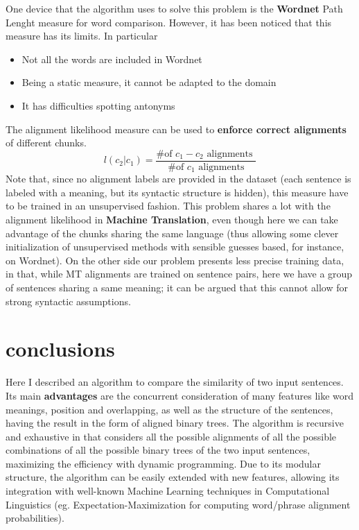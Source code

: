 One device that the algorithm uses to solve this problem is the \textbf{Wordnet} Path Lenght measure for word comparison. However, it has been noticed that this measure has its limits. In particular
\begin{itemize}
\item Not all the words are included in Wordnet
\item Being a static measure, it cannot be adapted to the domain
\item It has difficulties spotting antonyms
\end{itemize}
The alignment likelihood measure can be used to \textbf{enforce correct alignments} of different chunks.
$$
l(c_2|c_1)=\frac{\text{\# of }c_1-c_2\text{ alignments }}{\text{\# of }c_1\text{ alignments}}
$$
Note that, since no alignment labels are provided in the dataset (each sentence is labeled with a meaning, but its syntactic structure is hidden), this measure have to be trained in an unsupervised fashion. This problem shares a lot with the alignment likelihood in \textbf{Machine Translation}, even though here we can take advantage of the chunks sharing the same language (thus allowing some clever initialization of unsupervised methods with sensible guesses based, for instance, on Wordnet). On the other side our problem presents less precise training data, in that, while MT alignments are trained on sentence pairs, here we have a group of sentences sharing a same meaning; it can be argued that this cannot allow for strong syntactic assumptions.
\section{conclusions} \label{conclusions}
Here I described an algorithm to compare the similarity of two input sentences. Its main \textbf{advantages} are the concurrent consideration of many features like word meanings, position and overlapping, as well as the structure of the sentences, having the result in the form of aligned binary trees. The algorithm is recursive and exhaustive in that considers all the possible alignments of all the possible combinations of all the possible binary trees of the two input sentences, maximizing the efficiency with dynamic programming. Due to its modular structure, the algorithm can be easily extended with new features, allowing its integration with well-known Machine Learning techniques in Computational Linguistics (eg. Expectation-Maximization for computing word/phrase alignment probabilities).

